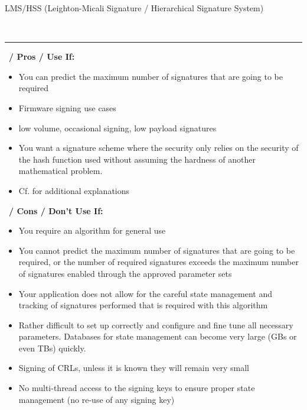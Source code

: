 \begin{algorithmbox}{LMS/HSS (Leighton-Micali Signature / Hierarchical Signature System)}
\begin{minipage}[t]{0.64\textwidth}
    \end{minipage}\\
    \hrule
    \vspace{1\baselineskip}
    \begin{minipage}[t]{0.49\textwidth}
        \scriptsize\faThumbsUp\, {\bfseries / Pros / Use If:}
        \begin{itemize}[leftmargin=*]
            \setlength\itemsep{0em}
            \item You can predict the maximum number of signatures that are going to be required
            \item Firmware signing use cases
            \item low volume, occasional signing, low payload signatures
            \item You want a signature scheme where the security only relies on the security of the hash function used without assuming the hardness of another mathematical problem.
            \item Cf.  for additional explanations
        \end{itemize}
    \end{minipage}
    \hfill
    \begin{minipage}[t]{0.49\textwidth}
        \scriptsize \faThumbsDown\, {\bfseries / Cons / Don't Use If:}
        \begin{itemize}[leftmargin=*]
        \tiny
            \setlength\itemsep{0em}
            \item You require an algorithm for general use
            \item You cannot predict the maximum number of signatures that are going to be required, or the number of required signatures exceeds the maximum number of signatures enabled through the approved parameter sets
            \item Your application does not allow for the careful state management and tracking of signatures performed that is required with this algorithm
            \item Rather difficult to set up correctly and configure and fine tune all necessary parameters. Databases for state management can become very large (GBs or even TBs) quickly.
            \item Signing of CRLs, unless it is known they will remain very small
            \item No multi-thread access to the signing keys to ensure proper state management (no re-use of any signing key)
        \end{itemize}
    \end{minipage}
\end{algorithmbox}
